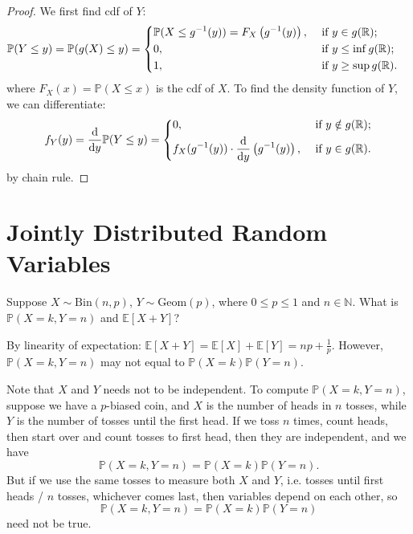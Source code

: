 \begin{proof}
    We first find cdf of \(Y\):
    \begin{align*}
        \mathbb{P} (Y \le y) &= \mathbb{P} (g(X) \le y) = \begin{dcases}
            \mathbb{P} (X \le g^{-1}(y)) = F_X \left( g^{-1}(y) \right) , &\text{ if } y \in g(\mathbb{R}) ;\\
            0, &\text{ if } y \le \inf g(\mathbb{R}) ;\\
            1, &\text{ if } y \ge \sup g(\mathbb{R}).
        \end{dcases}
    \end{align*} 
    where \(F_X(x) = \mathbb{P} (X \le x)\) is the cdf of \(X\). To find the density function of \(Y\), we can differentiate:
    \[
        f_Y(y) = \frac{\mathrm{d}}{\mathrm{d}y} \mathbb{P} (Y \le y) = \begin{dcases}
            0, &\text{ if } y \notin g(\mathbb{R}) ;\\
            f_X(g^{-1} (y)) \cdot \frac{\mathrm{d}}{\mathrm{d}y} \left( g^{-1}(y) \right)  , &\text{ if } y \in g(\mathbb{R}).
        \end{dcases} 
    \]  
    by chain rule.
\end{proof}

\chapter{Jointly Distributed Random Variables}
\begin{eg}
    Suppose \(X \sim \mathrm{Bin}(n, p)\), \(Y \sim \mathrm{Geom}(p) \), where \(0 \le p \le 1\) and \(n \in \mathbb{N} \). What is \(\mathbb{P} (X = k, Y = n)\) and \(\mathbb{E} [X + Y]\)?      
\end{eg}

\begin{answer}
    By linearity of expectation: \(\mathbb{E} [X + Y] = \mathbb{E} [X] + \mathbb{E} [Y] = np + \frac{1}{p}\). However, \(\mathbb{P} (X = k, Y = n)\) may not equal to \(\mathbb{P} (X = k) \mathbb{P} (Y = n)\). 

    Note that \(X\) and \(Y\) needs not to be independent. To compute \(\mathbb{P} (X = k, Y = n)\), suppose we have a \(p\)-biased coin, and \(X\) is the number of heads in \(n\) tosses, while \(Y\) is the number of tosses until the first head. If we toss \(n\) times, count heads, then start over and count tosses to first head, then they are independent, and we have 
    \[
        \mathbb{P} (X = k, Y = n) = \mathbb{P} (X = k) \mathbb{P} (Y = n).
    \]        
    But if we use the same tosses to measure both \(X\) and \(Y\), i.e. tosses until first heads / \(n\) tosses, whichever comes last, then variables depend on each other, so 
    \[
       \mathbb{P} (X = k, Y = n) = \mathbb{P} (X = k) \mathbb{P} (Y = n) 
    \]
    need not be true.
\end{answer}


